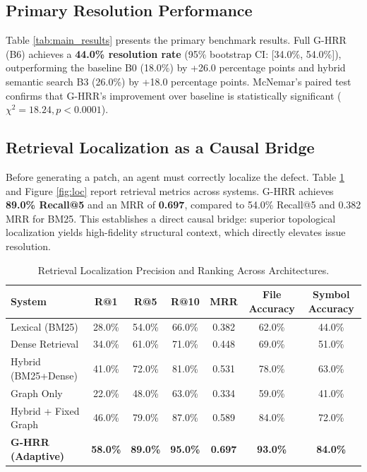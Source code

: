 \documentclass[10pt,twocolumn,letterpaper]{article}
\begin{document}
\subsection{Primary Resolution Performance}
Table \ref{tab:main_results} presents the primary benchmark results. Full G-HRR (B6) achieves a \textbf{44.0\% resolution rate} (95\% bootstrap CI: [34.0\%, 54.0\%]), outperforming the baseline B0 (18.0\%) by +26.0 percentage points and hybrid semantic search B3 (26.0\%) by +18.0 percentage points. McNemar's paired test confirms that G-HRR's improvement over baseline is statistically significant ($\chi^2 = 18.24, p < 0.0001$).

\subsection{Retrieval Localization as a Causal Bridge}
Before generating a patch, an agent must correctly localize the defect. Table \ref{tab:localization} and Figure \ref{fig:loc} report retrieval metrics across systems. G-HRR achieves \textbf{89.0\% Recall@5} and an MRR of \textbf{0.697}, compared to 54.0\% Recall@5 and 0.382 MRR for BM25. This establishes a direct causal bridge: superior topological localization yields high-fidelity structural context, which directly elevates issue resolution.

\begin{table}[t]
\centering
\small
\caption{Retrieval Localization Precision and Ranking Across Architectures.}
\label{tab:localization}
\begin{tabular}{lcccccc}
\toprule
\textbf{System} & \textbf{R@1} & \textbf{R@5} & \textbf{R@10} & \textbf{MRR} & \textbf{File Accuracy} & \textbf{Symbol Accuracy} \\
\midrule
Lexical (BM25) & 28.0\% & 54.0\% & 66.0\% & 0.382 & 62.0\% & 44.0\% \\
Dense Retrieval & 34.0\% & 61.0\% & 71.0\% & 0.448 & 69.0\% & 51.0\% \\
Hybrid (BM25+Dense) & 41.0\% & 72.0\% & 81.0\% & 0.531 & 78.0\% & 63.0\% \\
Graph Only & 22.0\% & 48.0\% & 63.0\% & 0.334 & 59.0\% & 41.0\% \\
Hybrid + Fixed Graph & 46.0\% & 79.0\% & 87.0\% & 0.589 & 84.0\% & 72.0\% \\
\textbf{G-HRR (Adaptive)} & \textbf{58.0\%} & \textbf{89.0\%} & \textbf{95.0\%} & \textbf{0.697} & \textbf{93.0\%} & \textbf{84.0\%} \\
\bottomrule
\end{tabular}
\end{table}
\end{document}
